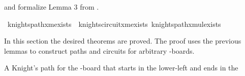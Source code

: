 \begin{isabellebody}
\begin{isamarkuptext}
 and  formalize Lemma 3 
from \cite{cull_decurtins_1987}.%
\end{isamarkuptext}\isamarkuptrue%
\isamarkupfalse%
\ knights{\isacharunderscore}{\kern0pt}path{\isacharunderscore}{\kern0pt}{}xm{\isacharunderscore}{\kern0pt}exists\ {\isacharequal}{\kern0pt}\ knights{\isacharunderscore}{\kern0pt}circuit{\isacharunderscore}{\kern0pt}{}xm{\isacharunderscore}{\kern0pt}exists\ knights{\isacharunderscore}{\kern0pt}path{\isacharunderscore}{\kern0pt}{}xm{\isacharunderscore}{\kern0pt}ul{\isacharunderscore}{\kern0pt}exists%
\isadelimdocument
%
\endisadelimdocument
%
\isatagdocument
%
\isamarkuptrue%
%
\endisatagdocument
{\isafolddocument}%
%
\isadelimdocument
%
\endisadelimdocument
%
\begin{isamarkuptext}%
In this section the desired theorems are proved. The proof uses the previous lemmas to 
construct paths and circuits for arbitrary -boards.%
\end{isamarkuptext}\isamarkuptrue%
%
\begin{isamarkuptext}%
A Knight's path for the -board that starts in the lower-left and ends in the 

\end{isamarkuptext}
\end{isabellebody}
